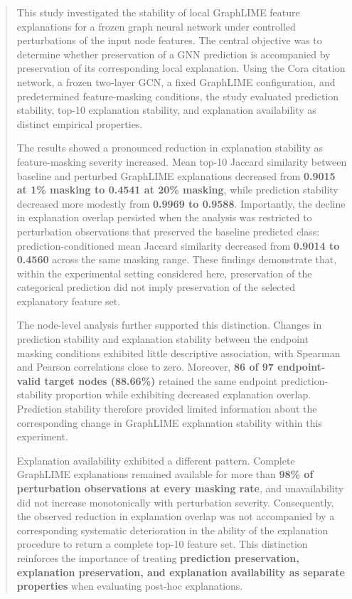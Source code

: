 \documentclass[a4paper]{article}
\begin{document}
\begin{quote}
This study investigated the stability of local GraphLIME feature
explanations for a frozen graph neural network under controlled
perturbations of the input node features. The central objective was to
determine whether preservation of a GNN prediction is accompanied by
preservation of its corresponding local explanation. Using the Cora
citation network, a frozen two-layer GCN, a fixed GraphLIME
configuration, and predetermined feature-masking conditions, the study
evaluated prediction stability, top-10 explanation stability, and
explanation availability as distinct empirical properties.

The results showed a pronounced reduction in explanation stability as
feature-masking severity increased. Mean top-10 Jaccard similarity
between baseline and perturbed GraphLIME explanations decreased from
\textbf{0.9015 at 1\% masking to 0.4541 at 20\% masking}, while
prediction stability decreased more modestly from \textbf{0.9969 to
0.9588}. Importantly, the decline in explanation overlap persisted when
the analysis was restricted to perturbation observations that preserved
the baseline predicted class: prediction-conditioned mean Jaccard
similarity decreased from \textbf{0.9014 to 0.4560} across the same
masking range. These findings demonstrate that, within the experimental
setting considered here, preservation of the categorical prediction did
not imply preservation of the selected explanatory feature set.

The node-level analysis further supported this distinction. Changes in
prediction stability and explanation stability between the endpoint
masking conditions exhibited little descriptive association, with
Spearman and Pearson correlations close to zero. Moreover, \textbf{86 of
97 endpoint-valid target nodes (88.66\%)} retained the same endpoint
prediction-stability proportion while exhibiting decreased explanation
overlap. Prediction stability therefore provided limited information
about the corresponding change in GraphLIME explanation stability within
this experiment.

Explanation availability exhibited a different pattern. Complete
GraphLIME explanations remained available for more than \textbf{98\% of
perturbation observations at every masking rate}, and unavailability did
not increase monotonically with perturbation severity. Consequently, the
observed reduction in explanation overlap was not accompanied by a
corresponding systematic deterioration in the ability of the explanation
procedure to return a complete top-10 feature set. This distinction
reinforces the importance of treating \textbf{prediction preservation,
explanation preservation, and explanation availability as separate
properties} when evaluating post-hoc explanations.


\end{quote}
\end{document}
